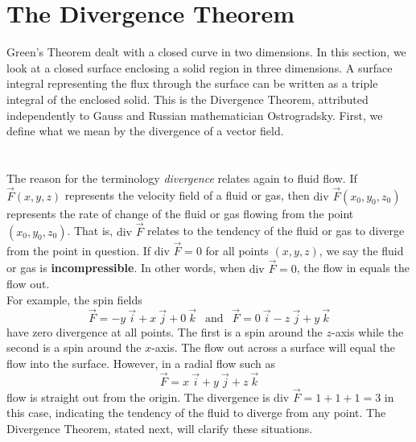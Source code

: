 \section{The Divergence Theorem}\label{sec:div_theorem}

Green's Theorem dealt with a closed curve in two dimensions.  In this section, we look at a closed surface enclosing a solid region in three dimensions.  A surface integral representing the flux through the surface can be written as a triple integral of the enclosed solid.  This is the Divergence Theorem, attributed independently to Gauss and Russian mathematician Ostrogradsky. First, we define what we mean by the divergence of a vector field.\\

\\

\\

The reason for the terminology \emph{divergence} relates again to fluid flow. If $\vec F(x,y,z)$ represents the velocity field of a fluid or gas, then $\text{div } \vec F (x_0,y_0,z_0)$ represents the rate of change of the fluid or gas flowing from the point $(x_0,y_0,z_0)$. That is, $\text{div } \vec F$ relates to the tendency of the fluid or gas to diverge from the point in question. If $\text{div } \vec F = 0$ for all points $(x,y,z)$, we say the fluid or gas is \textbf{incompressible}. In other words, when $\text{div } \vec F = 0$, the flow in equals the flow out.\\

For example, the spin fields $$\vec F = -y \: \vec i + x \: \vec j + 0 \: \vec k \: \: \text{ and } \: \: \vec F = 0 \: \vec i - z \: \vec j + y \: \vec k$$
have zero divergence at all points.  The first is a spin around the $z$-axis while the second is a spin around the $x$-axis.  The flow out across a surface will equal the flow into the surface. However, in a radial flow such as $$\vec F = x \: \vec i + y \: \vec j + z \: \vec k$$ flow is straight out from the origin.  The divergence is $\text{div } \vec F = 1 + 1 + 1 = 3$ in this case, indicating the tendency of the fluid to diverge from any point.  The Divergence Theorem, stated next, will clarify these situations.\\

